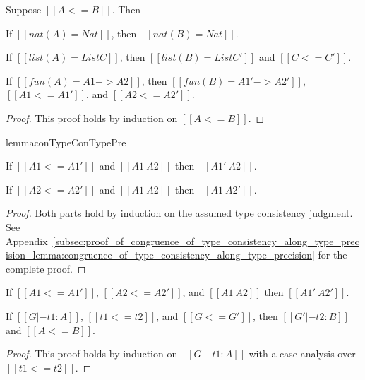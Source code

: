 \begin{lemma}
  \label{lemma:fun_type_pre}
  Suppose $[[A <= B]]$.  Then
  \begin{enumR}\small
  \item If $[[nat(A) = Nat]]$, then $[[nat(B) = Nat]]$.    
  \item If $[[list(A) = List C]]$, then $[[list(B) = List C']]$ and $[[C <= C']]$.
  \item If $[[fun(A) = A1 -> A2]]$, then $[[fun(B) = A1' -> A2']]$, $[[A1 <= A1']]$, and $[[A2 <= A2']]$.
  \end{enumR}
\end{lemma}
\begin{proof}
  This proof holds by induction on $[[A <= B]]$.
\end{proof}

\begin{restatable}[]{lemma}{conTypeConTypePre}
  \label{lemma:congruence_of_type_consistency_along_type_precision}
  \begin{enumR}\small
  \item[] 
  \item If $[[A1 <= A1']]$ and $[[A1 ~ A2]]$ then
    $[[A1' ~ A2]]$.
    
  \item If $[[A2 <= A2']]$ and $[[A1 ~ A2]]$ then
    $[[A1 ~ A2']]$.  
  \end{enumR}  
\end{restatable}
\begin{proof}
  Both parts hold by induction on the assumed type consistency
  judgment.  See
  Appendix~\ref{subsec:proof_of_congruence_of_type_consistency_along_type_precision_lemma:congruence_of_type_consistency_along_type_precision}
  for the complete proof.
\end{proof}

\begin{corollary}
  \label{corollary:congruence_of_type_consistency_along_type_precision}
  If $[[A1 <= A1']]$, $[[A2 <= A2']]$, and $[[A1 ~ A2]]$ then
  $[[A1' ~ A2']]$.  
\end{corollary}

\begin{lemma}
  \label{lemma:typing_for_type_precision}
  If $[[G |- t1 : A]]$, $[[t1 <= t2]]$, and $[[G <= G']]$, then $[[G' |- t2 : B]]$ and $[[A <= B]]$.
\end{lemma}
\begin{proof}
  This proof holds by induction on $[[G |- t1 : A]]$ with a case analysis over $[[t1 <= t2]]$.
\end{proof}

